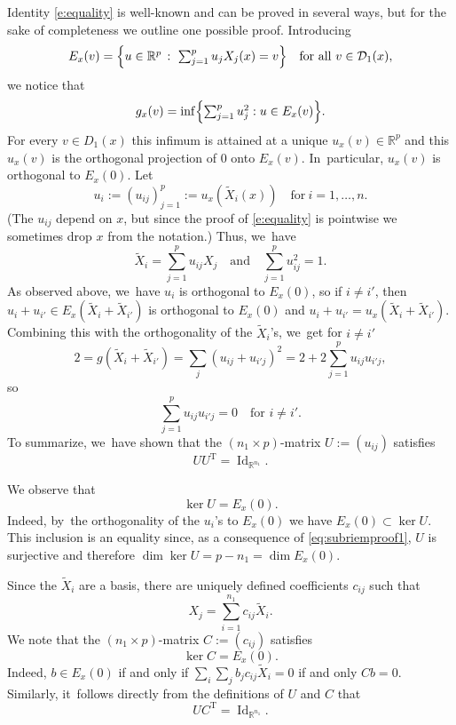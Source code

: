 \documentclass[10pt]{amsart}
\DeclareMathOperator{\Id}{Id}
\theoremstyle{definition}
\newcommand{\1}{\mathbbm{1}}
\newcommand{\R}{\mathbb{R}}
\begin{document}
Identity \eqref{e:equality} is well-known and can be proved in several ways, but for the sake of completeness we outline one possible proof. Introducing
\[
E_x(v)= \Bigl\{\textstyle u\in \mathbb R^p\,:\ \sum_{j=1}^{p} u_j X_j(x) =v\Bigr\}
\quad\text{for all}\ v\in \mathcal D_1(x),
\]
we notice that
\[
g_x(v) = \inf\Bigl\{ \textstyle\sum_{j=1}^p u_j^2 : u\in E_x(v)\Bigr\}.
\]
For every $v\in D_1(x)$ this infimum is attained at a unique $u_x(v)\in \mathbb R^p$ and this $u_x(v)$ is the orthogonal projection of $0$ onto $E_x(v)$. In~particular, $u_x(v)$ is orthogonal to $E_x(0)$. Let
\[
u_i := (u_{ij})_{j=1}^p := u_x(\tilde X_i(x))
\quad\text{for}\ i=1,\ldots, n.
\]
(The $u_{ij}$ depend on $x$, but since the proof of \eqref{e:equality} is pointwise we sometimes drop $x$ from the notation.) Thus, we~have
\[
\tilde{X}_i=\sum_{j=1}^p u_{ij} X_j
\quad\text{and}\quad\sum_{j=1}^p u_{ij}^2=1.
\]
As observed above, we~have $u_i$ is orthogonal to $E_x(0)$, so if $i\neq i'$, then $u_i+ u_{i'}\in E_x(\tilde{X}_i+\tilde X_{i'})$ is orthogonal to $E_x(0)$ and $u_i + u_{i'} = u_x(\tilde{X}_i+\tilde X_{i'})$. Combining this with the orthogonality of the $\tilde{X}_i$'s, we~get for $i\neq i'$
\[
2= g(\tilde X_i+\tilde X_{i'})= \sum_j (u_{ij} +u_{i'j})^2 = 2 +2 \sum_{j=1}^p u_{ij} u_{i' j},
\]
so
\[
\sum_{j=1}^p u_{ij} u_{i' j}=0 \quad\text{for } i\neq i'.
\]
To summarize, we~have shown that the $(n_1\times p)$-matrix $U:=(u_{ij})$ satisfies
\begin{equation}
\label{eq:subriemproof1}
U U^\mathrm{T} = {\Id_{\R^{n_1}}}.
\end{equation}

We observe that
\begin{equation}
\label{eq:subriemproof3}
\ker U = E_x(0).
\end{equation}
Indeed, by~the orthogonality of the $u_i$'s to $E_x(0)$ we have $E_x(0)\subset \ker U$. This inclusion is an equality since, as a consequence of \eqref{eq:subriemproof1}, $U$ is surjective and therefore $\dim \ker U = p - n_1 = \dim E_x(0)$.

Since the $\tilde X_i$ are a basis, there are uniquely defined coefficients $c_{ij}$ such that
\[
X_j =\sum_{i=1}^{n_1} c_{ij} \tilde X_i.
\]
We note that the $(n_1\times p)$-matrix $C :=(c_{ij})$ satisfies
\begin{equation}
\label{eq:subriemproof4}
\ker C = E_x(0).
\end{equation}
Indeed, $b\in E_x(0)$ if and only if $\sum_i \sum_j b_j c_{ij} \tilde X_i = 0$ if and only $C b =0$. Similarly, it~follows directly from the definitions of $U$ and $C$ that
\begin{equation}
\label{eq:subriemproof2}
U C^\mathrm{T} = {\Id_{\R^{n_1}}}.
\end{equation}
\end{document}
